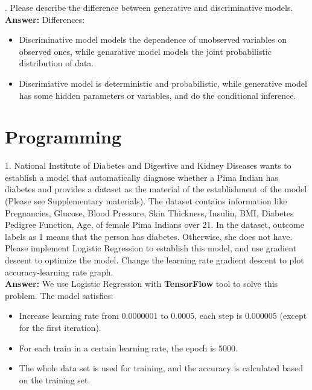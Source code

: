 \documentclass{article}
\begin{document}
. Please describe the difference between generative and discriminative models. \\

\textbf{Answer:} Differences:

\begin{itemize}
    \item Discriminative model models the dependence of unobserved variables on observed ones, while genarative model models the joint probabilistic distribution of data. 
    
    \item Discrimiative model is deterministic and probabilistic, while generative model has some hidden parameters or variables, and do the conditional inference.
    
\end{itemize}


\newpage
\section{Programming}
1. National Institute of Diabetes and Digestive and Kidney Diseases wants to establish a model that automatically diagnose whether a Pima
 Indian has diabetes and provides a dataset as the material of the establishment of the model (Please see Supplementary materials). The dataset contains information like Pregnancies, Glucose, Blood Pressure, Skin Thickness, Insulin, BMI, Diabetes Pedigree Function, Age, of female Pima Indians over 21. In the dataset, outcome labels as 1 means that the person has diabetes. Otherwise, she does not have. \\

\noindent Please implement Logistic Regression to establish this model, and use gradient descent to optimize the model. Change the learning rate gradient descent to plot accuracy-learning rate graph. \\

\textbf{Answer:} We use Logistic Regression with \textbf{TensorFlow} tool to solve this problem. The model satisfies:

\begin{itemize}
    \item Increase learning rate from $0.0000001$ to $0.0005$, each step is $0.000005$ (except for the first iteration).
    
    \item For each train in a certain learning rate, the epoch is $5000$.
    
    \item The whole data set is used for training, and the accuracy is calculated based on the training set.
    
\end{itemize}
\end{document}
